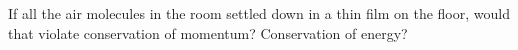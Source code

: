 If all the air molecules in the room settled down in a thin film on the floor,
would that violate conservation of momentum? Conservation of energy?
